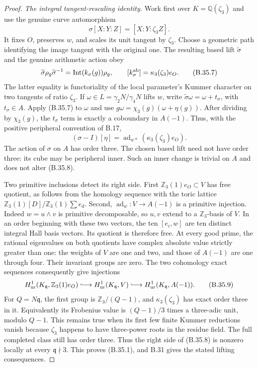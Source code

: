 \begin{proof}
\emph{The integral tangent-rescaling identity.}
Work first over $K=\mathbb Q(\zeta_3)$ and use the genuine
curve automorphism
\[
              \sigma[X:Y:Z]=[X:Y:\zeta_3Z].                  \tag{B.35.6}
\]
It fixes $O$, preserves $w$, and scales its unit tangent
by $\zeta_3$.
Choose a geometric path identifying the image tangent
with the original one. The resulting based lift
$\widetilde\sigma$ and the genuine arithmetic action obey
\[
 \widetilde\sigma\rho_g\widetilde\sigma^{-1}
                  =\operatorname{Int}(k_\sigma(g))\rho_g,
 \qquad [k_\sigma^{\rm ab}]
                  =\kappa_3(\zeta_3)e_O .                    \tag{B.35.7}
\]
The latter equality is functoriality of the local
parameter's Kummer character on two tangents of ratio
$\zeta_3$.
If $\omega\in L=\gamma_2N/\gamma_4N$ lifts $w$, write
$\widetilde\sigma\omega=\omega+t_\sigma$, with
$t_\sigma\in A$.
Apply (B.35.7) to $\omega$ and use
$g\omega=\chi_3(g)(\omega+\eta(g))$.
After dividing by $\chi_3(g)$, the $t_\sigma$ term is
exactly a coboundary in $A(-1)$. Thus, with the positive
peripheral convention of B.17,
\[
       (\sigma-I)[\eta]
                   =\operatorname{ad}_{w*}
                         (\kappa_3(\zeta_3)e_O).             \tag{B.35.8}
\]
The action of $\sigma$ on $A$ has order three.
The chosen based lift need not have order three:
its cube may be peripheral inner. Such an inner change
is trivial on $A$ and does not alter (B.35.8).

Two primitive inclusions detect its right side.
First $\mathbb Z_3(1)e_O\subset V$ has free quotient,
as follows from the homology sequence with the toric
lattice $\mathbb Z_3(1)[D]/\mathbb Z_3(1)\sum e_d$.
Second, $\operatorname{ad}_w:V\to A(-1)$ is a primitive
injection. Indeed $w=u\wedge v$ is primitive decomposable,
so $u,v$ extend to a $\mathbb Z_3$-basis of $V$.
In an order beginning with these two vectors, the ten
$[e_i,w]$ are ten distinct integral Hall basis vectors.
Its quotient is therefore free.
At every good prime, the rational eigenvalues on both
quotients have complex absolute value strictly greater
than one: the weights of $V$ are one and two, and those
of $A(-1)$ are one through four.
Their invariant groups are zero.
The two cohomology exact sequences consequently give
injections
\[
 H^1_{\rm ur}(K_{\mathfrak q},\mathbb Z_3(1)e_O)
  \lhook\joinrel\longrightarrow H^1_{\rm ur}(K_{\mathfrak q},V)
  \lhook\joinrel\longrightarrow H^1_{\rm ur}(K_{\mathfrak q},A(-1)).
                                                               \tag{B.35.9}
\]
For $Q=N\mathfrak q$, the first group is
$\mathbb Z_3/(Q-1)$, and $\kappa_3(\zeta_3)$ has exact
order three in it. Equivalently its Frobenius value is
$(Q-1)/3$ times a three-adic unit, modulo $Q-1$.
This remains true when its first few finite Kummer
reductions vanish because $\zeta_3$ happens to have
three-power roots in the residue field.
The full completed class still has order three.
Thus the right side of (B.35.8) is nonzero locally at
every $\mathfrak q\nmid3$. This proves (B.35.1), and
B.31 gives the stated lifting consequences.


\end{proof}

